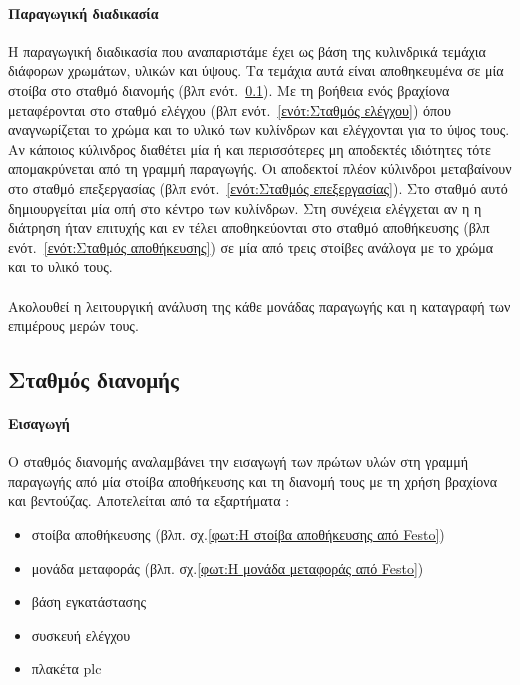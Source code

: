 \documentclass[a4paper,12pt,twoside]{report}
\begin{document}
{			\paragraph{Παραγωγική διαδικασία} {Η παραγωγική διαδικασία που αναπαριστάμε έχει ως βάση της κυλινδρικά τεμάχια διάφορων χρωμάτων, υλικών και ύψους. Τα τεμάχια αυτά είναι αποθηκευμένα σε μία στοίβα στο σταθμό διανομής {\footnotesize (βλπ ενότ.~\ref{ενότ:Σταθμός διανομής})}. Με τη βοήθεια ενός βραχίονα μεταφέρονται στο σταθμό ελέγχου {\footnotesize (βλπ ενότ.~\ref{ενότ:Σταθμός ελέγχου})} όπου αναγνωρίζεται το χρώμα και το υλικό των κυλίνδρων και ελέγχονται για το ύψος τους. Αν κάποιος κύλινδρος διαθέτει μία ή και περισσότερες μη αποδεκτές ιδιότητες τότε απομακρύνεται από τη γραμμή παραγωγής. Οι αποδεκτοί πλέον κύλινδροι μεταβαίνουν στο σταθμό επεξεργασίας {\footnotesize (βλπ ενότ.~\ref{ενότ:Σταθμός επεξεργασίας})}. Στο σταθμό αυτό δημιουργείται μία οπή στο κέντρο των κυλίνδρων. Στη συνέχεια ελέγχεται αν η η διάτρηση ήταν επιτυχής και εν τέλει αποθηκεύονται στο σταθμό αποθήκευσης {\footnotesize (βλπ ενότ.~\ref{ενότ:Σταθμός αποθήκευσης})} σε μία από τρεις στοίβες ανάλογα με το χρώμα και το υλικό τους. \cite{UMLΕνσωματωμέναΣυστήματα}
			}
			
			\paragraph{} {Ακολουθεί η λειτουργική ανάλυση της κάθε μονάδας παραγωγής και η καταγραφή των επιμέρους μερών τους.}
			}

			\FloatBarrier
			\subsection{Σταθμός διανομής \cite{FestoMPSDistributionStationManual} \cite{ΤοΦυσικόΣύστημαFestoMPS} \cite{UMLΕνσωματωμέναΣυστήματα}}
			
			\label{ενότ:Σταθμός διανομής}
				\paragraph{Εισαγωγή} {Ο σταθμός διανομής αναλαμβάνει την εισαγωγή των πρώτων υλών στη γραμμή παραγωγής από μία στοίβα αποθήκευσης και τη διανομή τους με τη χρήση βραχίονα και βεντούζας. Αποτελείται από τα εξαρτήματα :
				}
				\begin{itemize}
					\item στοίβα αποθήκευσης {\footnotesize (βλπ. σχ.\ref{φωτ:Η στοίβα αποθήκευσης από Festo})}
					\item μονάδα μεταφοράς {\footnotesize (βλπ. σχ.\ref{φωτ:Η μονάδα μεταφοράς από Festo})}
					\item βάση εγκατάστασης
					\item συσκευή ελέγχου
					\item πλακέτα plc
				\end{itemize}
\end{document}
